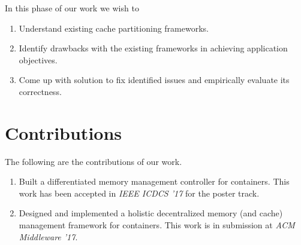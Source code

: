    \noindent In this phase of our work we wish to
      \begin{enumerate}
	\item Understand existing cache partitioning frameworks.
	\item Identify drawbacks with the existing frameworks in achieving application objectives.
	\item Come up with solution to fix identified issues and empirically evaluate its correctness.
      \end{enumerate}

  \section{Contributions}
    The following are the contributions of our work.  
      \begin{enumerate}
	\item Built a differentiated memory management controller for containers. This work has been 
	accepted in \textit{IEEE ICDCS '17} for the poster track.
	\item Designed and implemented a holistic decentralized memory (and cache) management framework for containers. This work 
	is in submission at \textit{ACM Middleware '17}.
      \end{enumerate}

  